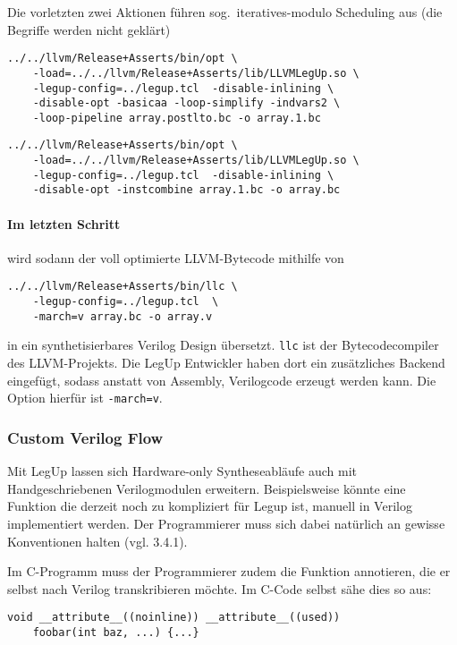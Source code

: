 \documentclass[oneside,a4paper]{article}
\def\B#1{\lstinline[style=bash]{#1}}
\begin{document}
Die vorletzten zwei Aktionen führen sog.\ iteratives-modulo
Scheduling aus (die Begriffe werden nicht geklärt)
\begin{lstlisting}[style=bash]
../../llvm/Release+Asserts/bin/opt \
    -load=../../llvm/Release+Asserts/lib/LLVMLegUp.so \
    -legup-config=../legup.tcl  -disable-inlining \
    -disable-opt -basicaa -loop-simplify -indvars2 \
    -loop-pipeline array.postlto.bc -o array.1.bc
\end{lstlisting}

\begin{lstlisting}[style=bash]
../../llvm/Release+Asserts/bin/opt \
    -load=../../llvm/Release+Asserts/lib/LLVMLegUp.so \
    -legup-config=../legup.tcl  -disable-inlining \
    -disable-opt -instcombine array.1.bc -o array.bc
\end{lstlisting}

\paragraph{Im letzten Schritt} wird sodann der voll optimierte LLVM-Bytecode
mithilfe von
\begin{lstlisting}[style=bash]
../../llvm/Release+Asserts/bin/llc \
    -legup-config=../legup.tcl  \
    -march=v array.bc -o array.v
\end{lstlisting}
in ein synthetisierbares Verilog Design übersetzt. \B{llc} ist
der Bytecodecompiler des LLVM-Projekts. Die LegUp Entwickler haben
dort ein zusätzliches Backend eingefügt, sodass anstatt von
Assembly, Verilogcode erzeugt werden kann.
Die Option hierfür ist \B{-march=v}.

\subsubsection{Custom Verilog Flow}
Mit LegUp lassen sich Hardware-only Syntheseabläufe auch
mit Handgeschriebenen Verilogmodulen erweitern. Beispielsweise
könnte eine Funktion die derzeit noch zu kompliziert für
Legup ist, manuell in Verilog implementiert
werden. Der Programmierer muss sich dabei natürlich an gewisse
Konventionen halten (vgl. 3.4.1).

Im C-Programm muss der Programmierer zudem die Funktion annotieren,
die er selbst nach Verilog transkribieren möchte.
Im C-Code selbst sähe dies so aus:

\begin{lstlisting}[style=c]
void __attribute__((noinline)) __attribute__((used))
    foobar(int baz, ...) {...}
\end{lstlisting}
\end{document}
